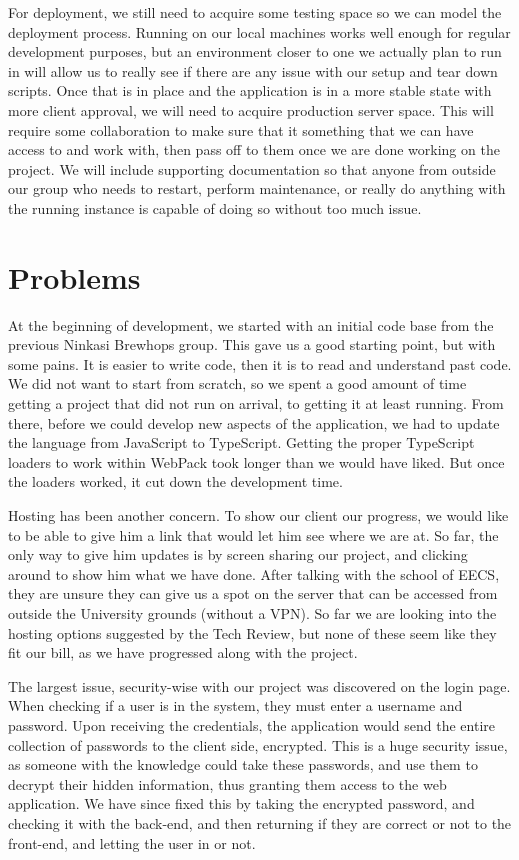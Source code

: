\documentclass[draftclsnofoot,onecolumn,journal,letterpaper,compsoc,10pt]{IEEEtran}
\begin{document}
For deployment, we still need to acquire some testing space so we can model the deployment process. Running on our local machines works well enough for regular development purposes, but an environment closer to one we actually plan to run in will allow us to really see if there are any issue with our setup and tear down scripts. Once that is in place and the application is in a more stable state with more client approval, we will need to acquire production server space. This will require some collaboration to make sure that it something that we can have access to and work with, then pass off to them once we are done working on the project. We will include supporting documentation so that anyone from outside our group who needs to restart, perform maintenance, or really do anything with the running instance is capable of doing so without too much issue.
 
\section{Problems}

At the beginning of development, we started with an initial code base from the previous Ninkasi Brewhops group. This gave us a good starting point, but with some pains. It is easier to write code, then it is to read and understand past code. We did not want to start from scratch, so we spent a good amount of time getting a project that did not run on arrival, to getting it at least running. From there, before we could develop new aspects of the application, we had to update the language from JavaScript to TypeScript. Getting the proper TypeScript loaders to work within WebPack took longer than we would have liked. But once the loaders worked, it cut down the development time. 

Hosting has been another concern. To show our client our progress, we would like to be able to give him a link that would let him see where we are at. So far, the only way to give him updates is by screen sharing our project, and clicking around to show him what we have done. After talking with the school of EECS, they are unsure they can give us a spot on the server that can be accessed from outside the University grounds (without a VPN). So far we are looking into the hosting options suggested by the Tech Review, but none of these seem like they fit our bill, as we have progressed along with the project. 

The largest issue, security-wise with our project was discovered on the login page. When checking if a user is in the system, they must enter a username and password. Upon receiving the credentials, the application would send the entire collection of passwords to the client side, encrypted. This is a huge security issue, as someone with the knowledge could take these passwords, and use them to decrypt their hidden information, thus granting them access to the web application. We have since fixed this by taking the encrypted password, and checking it with the back-end, and then returning if they are correct or not to the front-end, and letting the user in or not.  
\end{document}
